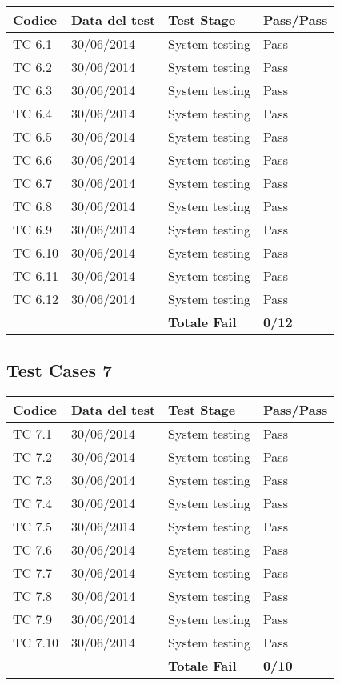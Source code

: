 \begin{tabular}{|p{3cm}|p{3cm}|p{3cm}|p{3cm}|}
	\hline
	\rowcolor{Gray}
	\textbf{Codice} & \textbf{Data del test} & \textbf{Test Stage} & \textbf{Pass/Pass}\tabularnewline
	\hline
	TC 6.1			& 30/06/2014 			& System testing		& Pass \tabularnewline
	\hline
	TC 6.2			& 30/06/2014 			& System testing		& Pass \tabularnewline
	\hline
	TC 6.3			& 30/06/2014 			& System testing		& Pass \tabularnewline
	\hline
	TC 6.4			& 30/06/2014 			& System testing		& Pass \tabularnewline
	\hline
	TC 6.5			& 30/06/2014 			& System testing		& Pass \tabularnewline
	\hline
	TC 6.6			& 30/06/2014 			& System testing		& Pass \tabularnewline
	\hline
	TC 6.7			& 30/06/2014 			& System testing		& Pass \tabularnewline
	\hline
	TC 6.8			& 30/06/2014 			& System testing		& Pass \tabularnewline
	\hline
	TC 6.9			& 30/06/2014 			& System testing		& Pass \tabularnewline
	\hline
	TC 6.10			& 30/06/2014 			& System testing		& Pass \tabularnewline
	\hline
	TC 6.11			& 30/06/2014 			& System testing		& Pass \tabularnewline
	\hline
	TC 6.12			& 30/06/2014 			& System testing		& Pass \tabularnewline
	\hline
					& 						& \textbf{Totale Fail}	& \textbf{0/12} \tabularnewline
	\hline
\end{tabular}

\subsection{Test Cases 7}

\begin{tabular}{|p{3cm}|p{3cm}|p{3cm}|p{3cm}|}
	\hline
	\rowcolor{Gray}
	\textbf{Codice} & \textbf{Data del test} & \textbf{Test Stage} & \textbf{Pass/Pass}\tabularnewline
	\hline
	TC 7.1			& 30/06/2014 			& System testing		& Pass \tabularnewline
	\hline
	TC 7.2			& 30/06/2014 			& System testing		& Pass \tabularnewline
	\hline
	TC 7.3			& 30/06/2014 			& System testing		& Pass \tabularnewline
	\hline
	TC 7.4			& 30/06/2014 			& System testing		& Pass \tabularnewline
	\hline
	TC 7.5			& 30/06/2014 			& System testing		& Pass \tabularnewline
	\hline
	TC 7.6			& 30/06/2014 			& System testing		& Pass \tabularnewline
	\hline
	TC 7.7			& 30/06/2014 			& System testing		& Pass \tabularnewline
	\hline
	TC 7.8			& 30/06/2014 			& System testing		& Pass \tabularnewline
	\hline
	TC 7.9			& 30/06/2014 			& System testing		& Pass \tabularnewline
	\hline
	TC 7.10			& 30/06/2014 			& System testing		& Pass \tabularnewline
	\hline
					& 						& \textbf{Totale Fail}	& \textbf{0/10} \tabularnewline
	\hline
\end{tabular}